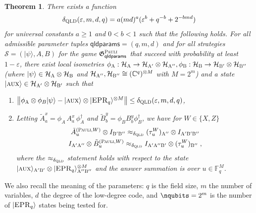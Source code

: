 \documentclass[11pt]{article}
\newtheorem{theorem}{Theorem}[section]
\theoremstyle{definition}
\newcommand{\ket}[1]{|#1\rangle}
\newcommand{\C}{\ensuremath{\mathbb{C}}}
\newcommand{\F}{\ensuremath{\mathbb{F}}}
\newcommand{\mH}{\ensuremath{\mathcal{H}}}
\newcommand{\eps}{\varepsilon}
\newcommand{\game}{\mathfrak{G}}
\newcommand{\strategy}{\mathscr{S}}
\newcommand{\gamestyle}[1]{\ensuremath{\textsc{#1}}\xspace}
\newcommand{\qld}{\gamestyle{QLD}}
\newcommand{\pauli}{\gamestyle{Pauli}}
\newcommand{\labelstyle}[1]{\ensuremath{\textsc{#1}}\xspace}
\newcommand{\EPR}{\labelstyle{EPR}}
\newcommand{\aux}{\labelstyle{aux}}
\newcommand{\alice}{\labelstyle{A}}
\newcommand{\bob}{\labelstyle{B}}
\newcommand{\qldparams}{\mathsf{qldparams}}
\begin{document}
\begin{theorem}
  \label{thm:pauli-appendix}
There exists a function 
\[\delta_{\qld}(\eps,m,d,q) = a(md)^a(\eps^b + q^{-b} + 2^{-bmd})\]
 for universal constants $a \geq 1$ and $0 < b < 1$ such that the following holds. For all admissible parameter tuples $\qldparams = (q,m,d)$ and for all strategies $\strategy = (\ket{\psi},A,B)$ for the game $\game^\pauli_\qldparams$ that succeed with probability at least $1 - \eps$, there exist local isometries $\phi_\alice: \mH_\alice \to \mH_{\alice'} \otimes \mH_{\alice''},\phi_\bob: \mH_\bob \to \mH_{\bob'} \otimes \mH_{\bob''}$ (where $\ket{\psi} \in \mH_\alice \otimes \mH_\bob$ and $\mH_{\alice''},\mH_{\bob''} \cong (\C^q)^{\otimes M}$ with $M = 2^m$) and a state $\ket{\aux} \in \mH_{\alice'} \otimes \mH_{\bob'}$ such that 
\begin{enumerate}
    \item $\left \| \phi_\alice \otimes \phi_B \ket{\psi} - \ket{\aux} \otimes \ket{\EPR_q}^{\otimes M}  \right \| \leq \delta_{\qld}(\eps,m,d,q)$,
    \item Letting $\tilde{A}^x_a = \phi_A\, A^x_a \, \phi_A^\dagger$ and $\tilde{B}^y_b = \phi_B B^y_b \phi_B^\dagger$, we have for $W \in \{X,Z\}$
    \begin{gather*}
        \tilde{A}^{(\pauli,W)}_u \otimes I_{\bob'\bob''} \approx_{\delta_{\qld}} (\tau^W_u)_{\alice''} \otimes I_{\alice' \bob' \bob''} \\
        I_{\alice'\alice''} \otimes \tilde{B}^{(\pauli,W)}_u    \approx_{\delta_{\qld}} I_{\alice' \alice'' \bob'} \otimes (\tau^W_u)_{\bob''}\;,
    \end{gather*}
    where the $\approx_{\delta_{\qld}}$ statement holds with respect to the state $\ket{\aux}_{\alice'\bob'} \otimes \ket{\EPR_q}^{\otimes M}_{\alice''\bob''}$ and the answer summation is over $u \in \F_q^M$.
\end{enumerate}
\end{theorem}
We also recall the meaning of the parameters: $q$ is the field size,
$m$ the number of variables, $d$ the degree of the low-degree code,
and $\nqubits=2^m$ is the number of $\ket{\EPR_q}$ states being tested for.
\end{document}
